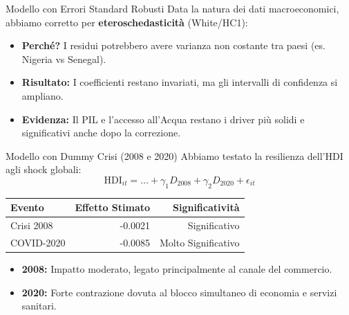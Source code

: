 \documentclass{beamer}
\begin{document}
\begin{frame}{Modello con Errori Standard Robusti}
    Data la natura dei dati macroeconomici, abbiamo corretto per \textbf{eteroschedasticità} (White/HC1):
    \vspace{0.3cm}
    \begin{itemize}
        \item \textbf{Perché?} I residui potrebbero avere varianza non costante tra paesi (es. Nigeria vs Senegal).
        \item \textbf{Risultato:} I coefficienti restano invariati, ma gli intervalli di confidenza si ampliano.
        \item \textbf{Evidenza:} Il PIL e l'accesso all'Acqua restano i driver più solidi e significativi anche dopo la correzione.
    \end{itemize}
\end{frame}

\begin{frame}{Modello con Dummy Crisi (2008 e 2020)}
    Abbiamo testato la resilienza dell'HDI agli shock globali:
    \begin{equation*}
        \text{HDI}_{it} = \dots + \gamma_1 D_{2008} + \gamma_2 D_{2020} + \epsilon_{it}
    \end{equation*}
    \begin{table}
        \small
        \centering
        \begin{tabular}{lrr}
            \toprule
            \textbf{Evento} & \textbf{Effetto Stimato} & \textbf{Significatività} \\
            \midrule
            Crisi 2008 & -0.0021 & Significativo \\
            COVID-2020 & -0.0085 & Molto Significativo \\
            \bottomrule
        \end{tabular}
    \end{table}
    \begin{itemize}
        \item \textbf{2008:} Impatto moderato, legato principalmente al canale del commercio.
        \item \textbf{2020:} Forte contrazione dovuta al blocco simultaneo di economia e servizi sanitari.
    \end{itemize}
\end{frame}
\end{document}

